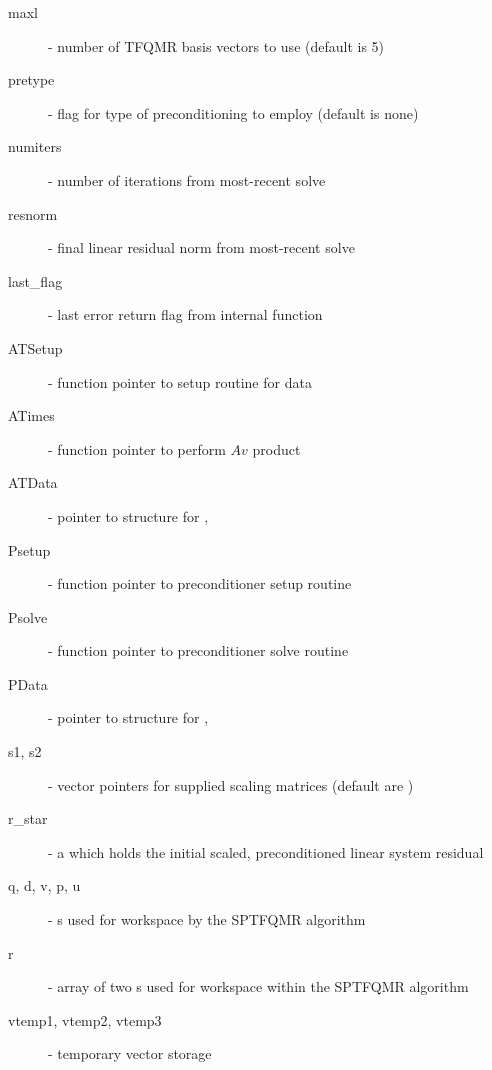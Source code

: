 \begin{description}
  \item[maxl] - number of TFQMR basis vectors to use (default is 5)
  \item[pretype] - flag for type of preconditioning to employ
    (default is none)
  \item[numiters] - number of iterations from most-recent solve
  \item[resnorm] - final linear residual norm from most-recent solve
  \item[last\_flag] - last error return flag from internal function
  \item[ATSetup] - function pointer to setup routine for  data
  \item[ATimes] - function pointer to perform $Av$ product
  \item[ATData] - pointer to structure for , 
  \item[Psetup] - function pointer to preconditioner setup routine
  \item[Psolve] - function pointer to preconditioner solve routine
  \item[PData] - pointer to structure for , 
  \item[s1, s2] - vector pointers for supplied scaling matrices
    (default are )
  \item[r\_star] - a {\nvector} which holds the initial scaled,
    preconditioned linear system residual 
  \item[q, d, v, p, u] - {\nvector}s used for workspace by the SPTFQMR
    algorithm
  \item [r] - array of two {\nvector}s used for workspace within the
    SPTFQMR algorithm 
  \item[vtemp1, vtemp2, vtemp3] - temporary vector storage
\end{description}

